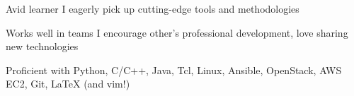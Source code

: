 
\begin{cvskills}

  \cvskill
    {Avid learner}
    {I eagerly pick up cutting-edge tools and methodologies}

  \cvskill
    {Works well in teams}
    {I encourage other's professional development, love sharing new technologies}

  \cvskill
    {Proficient with}
    {Python, C/C++, Java, Tcl, Linux, Ansible, OpenStack, AWS EC2, Git, LaTeX (and vim!)}

\end{cvskills}
